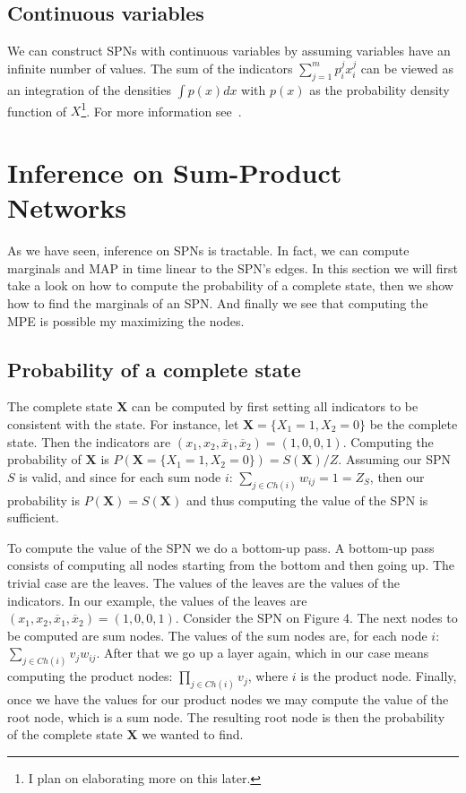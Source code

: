 \documentclass[a4paper,10pt]{article}
\theoremstyle{plain}
\begin{document}
\subsection{Continuous variables}

We can construct SPNs with continuous variables by assuming variables have an infinite number of
values. The sum of the indicators $\sum_{j=1}^m p_i^j x_i^j$ can be viewed as an integration of the
densities $\int p(x)dx$ with $p(x)$ as the probability density function of $X$\footnote{I plan on
elaborating more on this later.}. For more information see~\cite{poon-domingos}.

\section{Inference on Sum-Product Networks}

As we have seen, inference on SPNs is tractable. In fact, we can compute marginals and MAP in time
linear to the SPN's edges. In this section we will first take a look on how to compute the
probability of a complete state, then we show how to find the marginals of an SPN\@. And finally
we see that computing the MPE is possible my maximizing the nodes.

\subsection{Probability of a complete state}

The complete state $\mathbf{X}$ can be computed by first setting all indicators to be consistent
with the state. For instance, let $\mathbf{X}=\{X_1=1,X_2=0\}$ be the complete state. Then the
indicators are $(x_1,x_2,\overline{x}_1,\overline{x}_2)=(1, 0, 0, 1)$. Computing the probability
of $\mathbf{X}$ is $P(\mathbf{X}=\{X_1=1,X_2=0\})=S(\mathbf{X})/Z$. Assuming our SPN $S$ is valid,
and since for each sum node $i$: $\sum_{j\in Ch(i)} w_{ij}=1=Z_S$, then our probability is
$P(\mathbf{X})=S(\mathbf{X})$ and thus computing the value of the SPN is sufficient.

To compute the value of the SPN we do a bottom-up pass. A bottom-up pass consists of computing all
nodes starting from the bottom and then going up. The trivial case are the leaves. The values of
the leaves are the values of the indicators. In our example, the values of the leaves are
$(x_1,x_2,\overline{x}_1,\overline{x}_2)=(1,0,0,1)$. Consider the SPN on Figure 4. The next nodes
to be computed are sum nodes. The values of the sum nodes are, for each node $i$: $\sum_{j\in
Ch(i)}v_j w_{ij}$. After that we go up a layer again, which in our case means computing the product
nodes: $\prod_{j\in Ch(i)}v_j$, where $i$ is the product node. Finally, once we have the values for
our product nodes we may compute the value of the root node, which is a sum node. The resulting
root node is then the probability of the complete state $\mathbf{X}$ we wanted to find.
\end{document}
